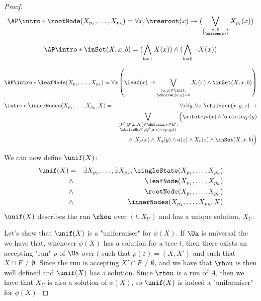 \documentclass[a4paper,UKenglish,cleveref, autoref, thm-restate]{lipics-v2021}
\begin{document}
\begin{proof}
	\begin{equation*}
		\AP \intro*	\rootNode (X_{p_1}, \ldots, X_{p_k})  = \forall x, \treeroot(x) \ra (\bigvee_{p_i \in \choose \deltauu(\varepsilon)} X_{p_i}(x))
	\end{equation*}

	\begin{equation*}
		\AP \intro* \inSet (X, x, b)  = (\bigwedge_{b = 1}  X(x)) \land (\bigwedge_{b = 0}  \lnot X(x))
	\end{equation*}

	\begin{equation*}
		\AP \intro* \leafNode (X_{p_1}, \ldots, X_{p_k})  = \forall x \left( \leaf(x) \rightarrow \bigvee_{\substack{(a, q) \in \init,\\ \choiceL(a,q) = b}} X_i(x) \land  \inSet (X,x,b)  \right)
	\end{equation*}
	\AP
	\begin{eqnarray*}
		\intro* \innerNodes (X_{p_1}, \ldots, X_{p_k}, X)  &=& \forall x \forall y, \forall z, \children (x,y,z) \ra \\
		&& \bigvee_{ \substack{(P',Q',a,R')\in \deltauu, \, r \in R', \\ \choiceN(P',Q',a,r) = (p,q,b)}} \Big( \ustate_{P'}(x) \land \ustate_{Q'}(y) \\
		&& \qquad \land \  X_p(x) \land X_q(y) \land a(z) \land X_r(z) \land  \inSet(X,x,b)\Big)
	\end{eqnarray*}


	We can now define $\unif(X)$:
	\begin{eqnarray*}
		\unif (X) &=& \exists X_{p_1}, \ldots, \exists X_{p_k}, \singleState (X_{p_1}, \ldots, X_{p_k}) \\
		&\land& \leafNode (X_{p_1}, \ldots, X_{p_k})\\
		&\land& \rootNode (X_{p_1}, \ldots, X_{p_k})\\
		&\land& \innerNodes (X_{p_1}, \ldots, X_{p_k}, X)
	\end{eqnarray*}
	$\unif(X)$ describes the run $\rhou$ over $(t,X_U)$ and has a unique solution, $X_U$.

	Let's show that $\unif(X)$ is a "uniformiser" for $\phi(X)$.
	If $\Ua$ is universal the we have that, whenever $\phi(X)$ has a solution for a tree $t$, then there exists an accepting "run" $\rho$ of $\Ua$ over $t$
	such that $\rho(\varepsilon) = (X,X')$ and such that $X \cap F \neq \emptyset$. Since the run is accepting $X' \cap F \neq \emptyset$, and we have that
	$\rhou$ is then well defined and $\unif(X)$ has a solution. Since $\rhou$ is a run of $A$, then we have that $X_U$ is also a solution of $\phi(X)$, so
	$\unif(X)$ is indeed a "uniformiser" for $\phi(X)$.

\end{proof}
\end{document}
